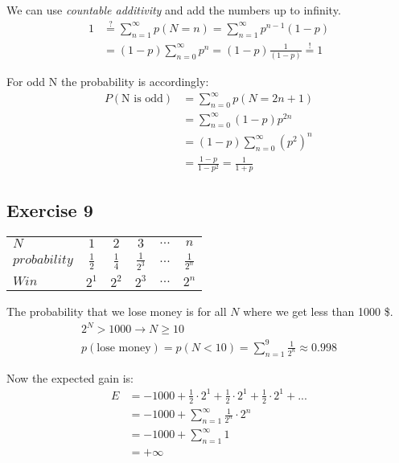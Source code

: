 We can use \textit{countable additivity} and add the numbers up to infinity.
\begin{align*}
1 &\stackrel{?}{=} \sum\limits_{n = 1}^\infty p(N = n) = \sum\limits_{n = 1}^\infty p^{n - 1}\left( 1 - p \right) \\
&= \left( 1 - p \right) \sum\limits_{n=0}^\infty p^n = \left( 1 - p \right) \frac{1}{\left( 1 - p \right)} \stackrel{!}{=} 1
\end{align*}

For odd N the probability is accordingly:
\begin{align*}
P\left(\mbox{N is odd}\right) &= \sum\limits_{n=0}^\infty p(N=2n+1)\\
&= \sum\limits_{n=0}^\infty \left( 1 - p \right) p^{2n} \\
&= \left( 1 - p \right) \sum\limits_{n=0}^\infty \left(p^2\right)^n \\
&= \frac{1-p}{1-p^2} = \frac{1}{1+p}
\end{align*}

\subsection*{Exercise 9}
\begin{tabular}{ l || c | c | c | c | c }
  $N$           & $1$ & $2$ & $3$ & $...$ & $n$ \\
  $probability$ & $\frac{1}{2}$ & $\frac{1}{4}$ & $\frac{1}{2^3}$ & $...$ & $\frac{1}{2^n}$ \\
  $Win$         & $2^1$ & $2^2$ & $2^3$ & $...$ & $2^n$ \\
\end{tabular}

The probability that we lose money is for all $N$ where we get less than 1000 \$.
\begin{align*}
2^N > 1000 \rightarrow N \geq 10 \\
p\left(\mbox{lose money}\right) = p(N<10) = \sum\limits_{n=1}^9 \frac{1}{2^n} \approx 0.998
\end{align*}

Now the expected gain is:
\begin{align*}
E &= -1000 + \frac{1}{2} \cdot 2^1 + \frac{1}{2} \cdot 2^1 + \frac{1}{2} \cdot 2^1 + ... \\
  &= -1000 + \sum\limits_{n=1}^\infty \frac{1}{2^n} \cdot 2^n \\
  &= -1000 + \sum\limits_{n=1}^\infty 1 \\
  &= +\infty
\end{align*}

